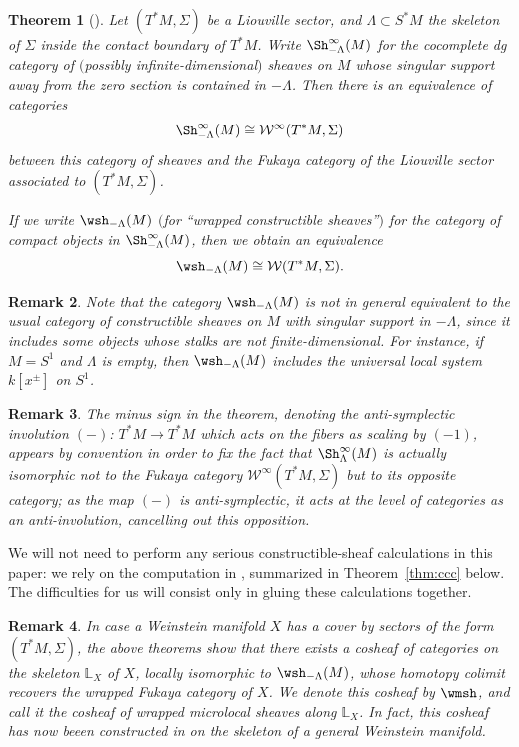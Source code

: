 \documentclass[10pt,a4paper]{amsart}
\numberwithin{equation}{section}
\newtheorem{Theorem}{Theorem}[section]
\newtheorem{Remark}[Theorem]{Remark} }
\def\LL{\mathbb{L}}
\def\cW{\mathcal{W}}
\begin{document}
\begin{Theorem}[{\cite[Theorem 1.1]{GPS3}}]%
 Let $(T^*M, \Sigma)$ be a Liouville sector, and $\Lambda\subset S^*M$ the skeleton of $\Sigma$ inside the contact boundary of $T^*M$. Write $\Sh^\infty_{-\Lambda}(M)$ for the cocomplete dg category of $($possibly infinite-dimensional$)$ sheaves on $M$ whose singular support away from the zero section is contained in $-\Lambda$. Then there is an equivalence of categories
 \[
 \Sh^\infty_{-\Lambda}(M) \cong \cW^\infty(T^*M,\Sigma)
 \]
 between this category of sheaves and the Fukaya category of the Liouville sector associated to $(T^*M,\Sigma)$.

 If we write $\wsh_{-\Lambda}(M)$ $($for ``wrapped constructible sheaves''$)$ for the category of compact objects in $\Sh^\infty_{-\Lambda}(M)$, then we obtain an equivalence
 \[
 \wsh_{-\Lambda}(M) \cong \cW(T^*M,\Sigma).
 \]
\end{Theorem}
\begin{Remark}
 Note that the category $\wsh_{-\Lambda}(M)$ is not in general equivalent to the usual category of constructible sheaves on $M$ with singular support in $-\Lambda$, since it includes some objects whose stalks are not finite-dimensional. For instance, if $M=S^1$ and $\Lambda$ is empty, then $\wsh_{-\Lambda}(M)$ includes the universal local system $k[x^\pm]$ on $S^1$.
\end{Remark}
\begin{Remark}
	The minus sign in the theorem, denoting the anti-symplectic involution $(-)$: $T^*M\to T^*M$ which acts on the fibers as scaling by $(-1)$, appears by convention in order to fix the fact that $\Sh_{\Lambda}^\infty(M)$ is actually isomorphic not to the Fukaya category $\cW^\infty(T^*M,\Sigma)$ but to its {\em opposite} category; as the map $(-)$ is anti-symplectic, it acts at the level of categories as an anti-involution, cancelling out this opposition.
\end{Remark}

We will not need to perform any serious constructible-sheaf calculations in this paper: we rely on the computation in \cite{Ku}, summarized in Theorem~\ref{thm:ccc} below. The difficulties for us will consist only in gluing these calculations together.

\begin{Remark}
 In case a Weinstein manifold $X$ has a cover by sectors of the form $(T^*M,\Sigma)$, the above theorems show that there exists a cosheaf of categories on the skeleton $\LL_X$ of $X$, locally isomorphic to $\wsh_{-\Lambda}(M)$, whose homotopy colimit recovers the wrapped Fukaya category of $X$. We denote this cosheaf by $\wmsh$, and call it the cosheaf of {\em wrapped microlocal sheaves} along $\LL_X$. In fact, this cosheaf has now beeen constructed in \cite{NS20} on the skeleton of a general Weinstein manifold.
\end{Remark}
\end{document}
